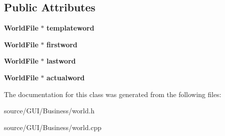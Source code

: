 \subsection*{Public Attributes}
\begin{DoxyCompactItemize}
\item 
{\bf World\+File} $\ast$ {\bfseries templateword}\label{classworld_a6c1650a316fb2ec9b7b360d9f22a459a}

\item 
{\bf World\+File} $\ast$ {\bfseries firstword}\label{classworld_aa259fc122f22493bb2b41a3e15b46088}

\item 
{\bf World\+File} $\ast$ {\bfseries lastword}\label{classworld_ab1ad7c41b86cfbb209493eac6f0bfadc}

\item 
{\bf World\+File} $\ast$ {\bfseries actualword}\label{classworld_a4123fdd0bb26b41e7510881f7c17a3ba}

\end{DoxyCompactItemize}


The documentation for this class was generated from the following files\+:\begin{DoxyCompactItemize}
\item 
source/\+G\+U\+I/\+Business/world.\+h\item 
source/\+G\+U\+I/\+Business/world.\+cpp\end{DoxyCompactItemize}
